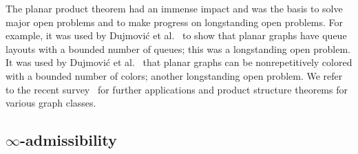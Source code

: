 \documentclass[1p,number,a4paper]{elsarticle}
\theoremstyle{remark}
\newcommand{\Cc}{\mathscr{C}}
\newcommand{\Dd}{\mathscr{D}}
\DeclareMathOperator{\td}{td}
\DeclareMathOperator{\wcol}{wcol}
\newtheorem{theorem}{Theorem}[section]
\begin{document}
The planar product theorem had an immense impact and was the basis to solve major open problems and to make progress on longstanding open problems. For example, it was used by Dujmovi\'c et al.~\cite{dujmovic2020planar} to show that planar graphs have queue layouts
with a bounded number of queues; this was a longstanding open problem. It was used by Dujmovi\'c et al.~\cite{dujmovic2020minor} that planar
graphs can be nonrepetitively colored with a bounded number of colors; another longstanding open problem. 
%
%
%
We refer to the recent survey~\cite{dvovrak2021notes} for further applications and product structure theorems for various graph classes. 




\subsection{\texorpdfstring{$\infty$}--admissibility}
\end{document}
